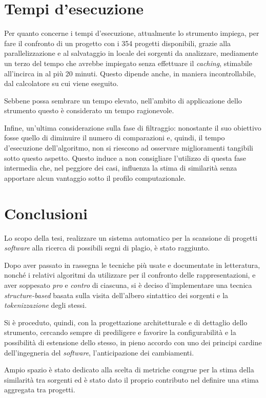 \section{Tempi d'esecuzione}
Per quanto concerne i tempi d'esecuzione, attualmente lo strumento impiega, per fare il confronto di un progetto con i 354 progetti disponibili, grazie alla parallelizzazione e al salvataggio in locale dei sorgenti da analizzare, mediamente un terzo del tempo che avrebbe impiegato senza effettuare il \textit{caching}, stimabile all'incirca in al più 20 minuti.
%
Questo dipende anche, in maniera incontrollabile, dal calcolatore su cui viene eseguito.

Sebbene possa sembrare un tempo elevato, nell'ambito di applicazione dello strumento questo è considerato un tempo ragionevole.

Infine, un'ultima considerazione sulla fase di filtraggio: nonostante il suo obiettivo fosse quello di diminuire il numero di comparazioni e, quindi, il tempo d'esecuzione dell'algoritmo, non si riescono ad osservare miglioramenti tangibili sotto questo aspetto.
%
Questo induce a non consigliare l'utilizzo di questa fase intermedia che, nel peggiore dei casi, influenza la stima di similarità senza apportare alcun vantaggio sotto il profilo computazionale.

\section{Conclusioni}
Lo scopo della tesi, realizzare un sistema automatico per la scansione di progetti \textit{software} alla ricerca di possibili segni di plagio, è stato raggiunto.

Dopo aver passato in rassegna le tecniche più usate e documentate in letteratura, nonché i relativi algoritmi da utilizzare per il confronto delle rappresentazioni, e aver soppesato \textit{pro} e \textit{contro} di ciascuna, si è deciso d'implementare una tecnica \textit{structure-based} basata sulla visita dell'albero sintattico dei sorgenti e la \textit{tokenizzazione} degli stessi.

Si è proceduto, quindi, con la progettazione architetturale e di dettaglio dello strumento, cercando sempre di prediligere e favorire la configurabilità e la possibilità di estensione dello stesso, in pieno accordo con uno dei principi cardine dell'ingegneria del \textit{software}, l'anticipazione dei cambiamenti.

Ampio spazio è stato dedicato alla scelta di metriche congrue per la stima della similarità tra sorgenti ed è stato dato il proprio contributo nel definire una stima aggregata tra progetti.

